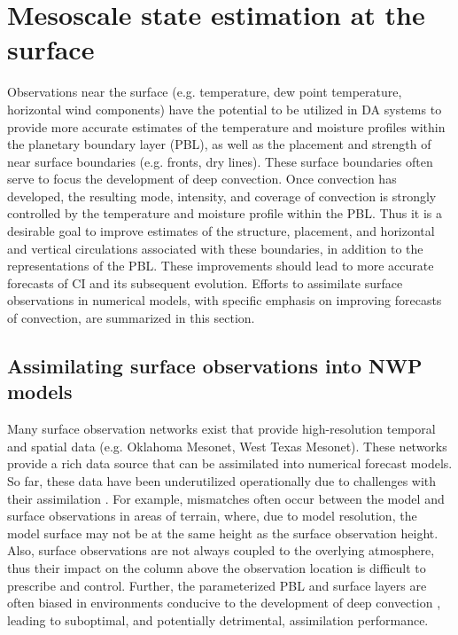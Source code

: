 \section{Mesoscale state estimation at the surface}
Observations near the surface (e.g. temperature, dew point temperature, horizontal wind components) have the potential to be utilized in DA systems to provide more accurate estimates of the temperature and moisture profiles within the planetary boundary layer (PBL), as well as the placement and strength of near surface boundaries (e.g. fronts, dry lines). These surface boundaries often serve to focus the development of deep convection. Once convection has developed, the resulting mode, intensity, and coverage of convection is strongly controlled by the temperature and moisture profile within the PBL. Thus it is a desirable goal to improve estimates of the structure, placement, and horizontal and vertical circulations associated with these boundaries, in addition to the representations of the PBL. These improvements should lead to more accurate forecasts of CI and its subsequent evolution. Efforts to assimilate surface observations in numerical models, with specific emphasis on improving forecasts of convection, are summarized in this section.

\subsection{Assimilating surface observations into NWP models}
Many surface observation networks exist that provide high-resolution temporal and spatial data (e.g. Oklahoma Mesonet, West Texas Mesonet). These networks provide a rich data source that can be assimilated into numerical forecast models. So far, these data have been underutilized operationally due to challenges with their assimilation \citep{puetal13}. For example, mismatches often occur between the model and surface observations in areas of terrain, where, due to model resolution, the model surface may not be at the same height as the surface observation height. Also, surface observations are not always coupled to the overlying atmosphere, thus their impact on the column above the observation location is difficult to prescribe and control. Further, the parameterized PBL and surface layers are often biased in environments conducive to the development of deep convection \citep{coniglioetal13}, leading to suboptimal, and potentially detrimental, assimilation performance. 

